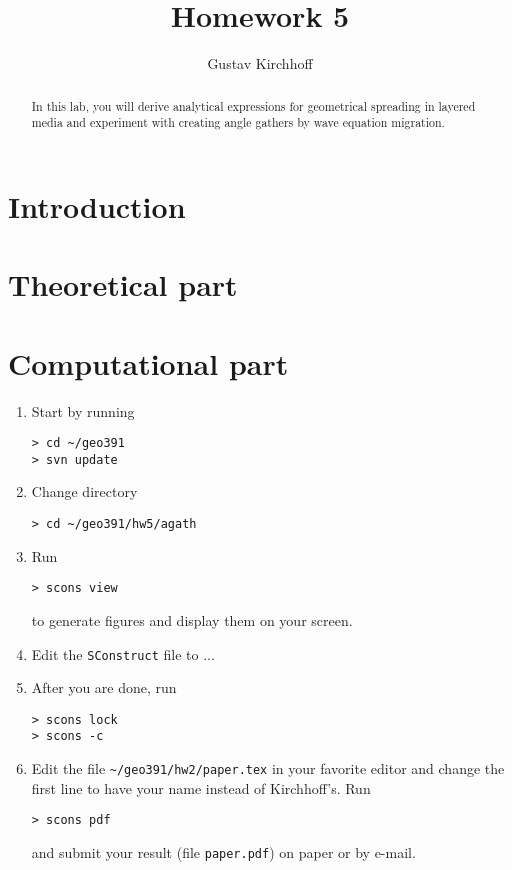 \author{Gustav Kirchhoff}
\title{Homework 5}

\begin{abstract}
In this lab, you will derive analytical expressions for geometrical
spreading in layered media and experiment with creating angle gathers
by wave equation migration.
\end{abstract}


\section{Introduction}


\section{Theoretical part}

\section{Computational part}

\begin{enumerate}

\item Start by running
\begin{verbatim}
> cd ~/geo391
> svn update
\end{verbatim}

    
\item Change directory 
\begin{verbatim}
> cd ~/geo391/hw5/agath
\end{verbatim}
\item Run
\begin{verbatim}
> scons view
\end{verbatim}
to generate figures and display them on your screen.  

\item Edit
  the \texttt{SConstruct} file to ...
    
\item After you are done, run
\begin{verbatim}
> scons lock 
> scons -c
\end{verbatim}

\item Edit the file
\verb#~/geo391/hw2/paper.tex# in your favorite editor and change the
first line to have your name instead of Kirchhoff's. Run
\begin{verbatim}
> scons pdf
\end{verbatim}
and submit your result (file \texttt{paper.pdf}) on paper or by
e-mail.

\end{enumerate}


{\small

}



